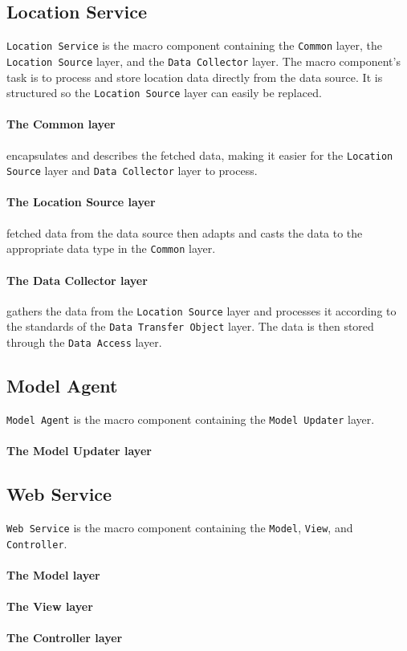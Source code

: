\subsection*{Location Service}\texttt{Location Service} is the macro component containing the \texttt{Common} layer, the \texttt{Location Source} layer, and the \texttt{Data Collector} layer.
The macro component's task is to process and store location data directly from the data source. It is structured so the \texttt{Location Source} layer can easily be replaced.

\paragraph{The Common layer} encapsulates and describes the fetched data, making it easier for the \texttt{Location Source} layer and \texttt{Data Collector} layer to process.

\paragraph{The Location Source layer} fetched data from the data source then adapts and casts the data to the appropriate data type in the \texttt{Common} layer.

\paragraph{The Data Collector layer} gathers the data from the \texttt{Location Source} layer and processes it according to the standards of the \texttt{Data Transfer Object} layer. The data is then stored through the \texttt{Data Access} layer.


\subsection*{Model Agent}\texttt{Model Agent} is the macro component containing the \texttt{Model Updater} layer.

\paragraph{The Model Updater layer}


\subsection*{Web Service}\texttt{Web Service} is the macro component containing the \texttt{Model}, \texttt{View}, and \texttt{Controller}.

\paragraph{The Model layer} 

\paragraph{The View layer}

\paragraph{The Controller layer}